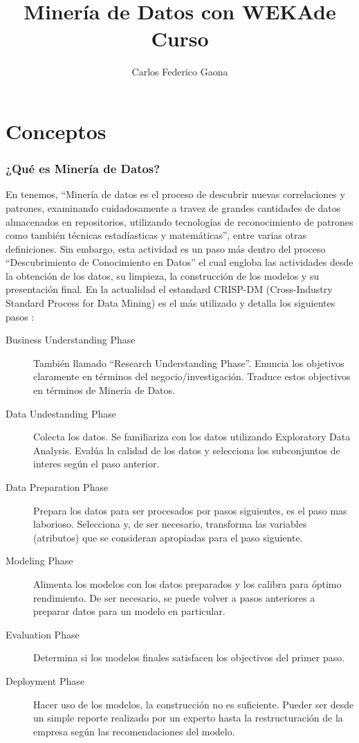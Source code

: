 \documentclass[10pt,a4paper]{article}
\author{Carlos Federico Gaona}
\title{Minería de Datos con WEKA\nNotas de Curso}
\date{}
\begin{document}
\part{Conceptos}
\section{¿Qué es Minería de Datos?}
En \cite{larose2014discovering} tenemos, ``Minería de datos es el proceso de descubrir nuevas correlaciones y patrones, examinando cuidadosamente a travez de grandes cantidades de datos almacenados en repositorios, utilizando tecnologías de reconocimiento de patrones como también técnicas estadíasticas y matemáticas'', entre varias otras definiciones. Sin embargo, esta actividad es un paso más dentro del proceso ``Descubrimiento de Conocimiento en Datos'' el cual engloba las actividades desde la obtención de los datos, su limpieza, la construcción de los modelos y su presentación final. En la actualidad el estandard CRISP-DM (Cross-Industry Standard Process for Data Mining) es el más utilizado \cite{oct2014poll} y detalla los siguientes pasos \cite{larose2014discovering}:
\begin{description}
\item[Business Understanding Phase] También llamado ``Research Understanding Phase''. Enuncia los objetivos claramente en términos del negocio/investigación. Traduce estos objectivos en términos de Minería de Datos.
\item[Data Undestanding Phase] Colecta los datos. Se familiariza con los datos utilizando Exploratory Data Analysis. Evalúa la calidad de los datos y selecciona los subconjuntos de interes según el paso anterior.
\item[Data Preparation Phase] Prepara los datos para ser procesados por pasos siguientes, es el paso mas laborioso. Selecciona y, de ser necesario, transforma las variables (atributos) que se consideran apropiadas para el paso siguiente.
\item[Modeling Phase] Alimenta los modelos con los datos preparados y los calibra para óptimo rendimiento. De ser necesario, se puede volver a pasos anteriores a preparar datos para un modelo en particular.
\item[Evaluation Phase] Determina si los modelos finales satisfacen los objectivos del primer paso.
\item[Deployment Phase] Hacer uso de los modelos, la construcción no es suficiente. Pueder ser desde un simple reporte realizado por un experto hasta la restructuración de la empresa según las recomendaciones del modelo.
\end{description}
\end{document}
